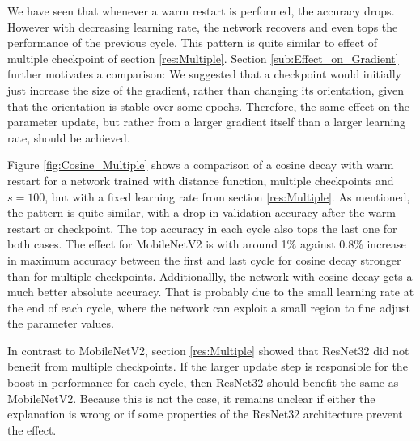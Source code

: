 We have seen that whenever a warm restart is performed, the accuracy drops.
However with decreasing learning rate, the network recovers and even tops the
performance of the previous cycle. This pattern is quite similar to effect of
multiple checkpoint of section \ref{res:Multiple}. Section
\ref{sub:Effect_on_Gradient} further motivates a comparison: We suggested that a
checkpoint would initially just increase the size of the gradient, rather than
changing its orientation, given that the orientation is stable over some epochs.
Therefore, the same effect on the parameter update, but rather from a larger
gradient itself than a larger learning rate, should be achieved.

Figure \ref{fig:Cosine_Multiple} shows a comparison of a cosine decay with warm
restart for a network trained with distance function, multiple checkpoints and
$s=100$, but with a fixed learning rate from section \ref{res:Multiple}. As
mentioned, the pattern is quite similar, with a drop in validation accuracy
after the warm restart or checkpoint. The top accuracy in each cycle also tops
the last one for both cases. The effect for MobileNetV2 is with around 1\%
against 0.8\% increase in maximum accuracy between the first and last cycle for
cosine decay stronger than for multiple checkpoints. Additionallly, the network
with cosine decay gets a much better absolute accuracy. That is probably due to
the small learning rate at the end of each cycle, where the network can exploit
a small region to fine adjust the parameter values.

In contrast to MobileNetV2, section \ref{res:Multiple} showed that ResNet32
did not benefit from multiple checkpoints. If the larger update step is responsible
for the boost in performance for each cycle, then ResNet32 should benefit the
same as MobileNetV2. Because this is not the case, it remains unclear if either
the explanation is wrong or if some properties of the ResNet32 architecture
prevent the effect.


